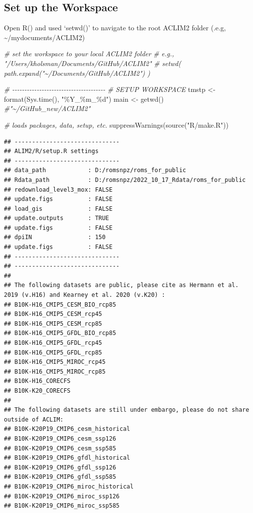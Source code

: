 \documentclass[
]{article}
\newenvironment{Shaded}{\begin{snugshade}}{\end{snugshade}}
\newcommand{\CommentTok}[1]{\textcolor[rgb]{0.56,0.35,0.01}{\textit{#1}}}
\newcommand{\FunctionTok}[1]{\textcolor[rgb]{0.00,0.00,0.00}{#1}}
\newcommand{\NormalTok}[1]{#1}
\newcommand{\OtherTok}[1]{\textcolor[rgb]{0.56,0.35,0.01}{#1}}
\newcommand{\StringTok}[1]{\textcolor[rgb]{0.31,0.60,0.02}{#1}}
\begin{document}
\hypertarget{set-up-the-workspace}{%
\subsection{Set up the Workspace}\label{set-up-the-workspace}}

Open R() and used `setwd()' to navigate to the root ACLIM2 folder (.e.g,
\textasciitilde/mydocuments/ACLIM2)

\begin{Shaded}
\begin{Highlighting}[]
    \CommentTok{\# set the workspace to your local ACLIM2 folder}
    \CommentTok{\# e.g., "/Users/kholsman/Documents/GitHub/ACLIM2"}
    \CommentTok{\# setwd( path.expand("\textasciitilde{}/Documents/GitHub/ACLIM2") )}
   
    \CommentTok{\# {-}{-}{-}{-}{-}{-}{-}{-}{-}{-}{-}{-}{-}{-}{-}{-}{-}{-}{-}{-}{-}{-}{-}{-}{-}{-}{-}{-}{-}{-}{-}{-}{-}{-}{-}{-}{-}{-}}
    \CommentTok{\# SETUP WORKSPACE}
\NormalTok{    tmstp  }\OtherTok{\textless{}{-}} \FunctionTok{format}\NormalTok{(}\FunctionTok{Sys.time}\NormalTok{(), }\StringTok{"\%Y\_\%m\_\%d"}\NormalTok{)}
\NormalTok{    main   }\OtherTok{\textless{}{-}} \FunctionTok{getwd}\NormalTok{()  }\CommentTok{\#"\textasciitilde{}/GitHub\_new/ACLIM2"}
    
    \CommentTok{\# loads packages, data, setup, etc.}
    \FunctionTok{suppressWarnings}\NormalTok{(}\FunctionTok{source}\NormalTok{(}\StringTok{"R/make.R"}\NormalTok{))}
\end{Highlighting}
\end{Shaded}

\begin{verbatim}
## ------------------------------
## ALIM2/R/setup.R settings 
## ------------------------------
## data_path            : D:/romsnpz/roms_for_public 
## Rdata_path           : D:/romsnpz/2022_10_17_Rdata/roms_for_public 
## redownload_level3_mox: FALSE 
## update.figs          : FALSE 
## load_gis             : FALSE 
## update.outputs       : TRUE 
## update.figs          : FALSE 
## dpiIN                : 150 
## update.figs          : FALSE 
## ------------------------------
## ------------------------------
## 
## The following datasets are public, please cite as Hermann et al. 2019 (v.H16) and Kearney et al. 2020 (v.K20) :
## B10K-H16_CMIP5_CESM_BIO_rcp85 
## B10K-H16_CMIP5_CESM_rcp45 
## B10K-H16_CMIP5_CESM_rcp85 
## B10K-H16_CMIP5_GFDL_BIO_rcp85 
## B10K-H16_CMIP5_GFDL_rcp45 
## B10K-H16_CMIP5_GFDL_rcp85 
## B10K-H16_CMIP5_MIROC_rcp45 
## B10K-H16_CMIP5_MIROC_rcp85 
## B10K-H16_CORECFS 
## B10K-K20_CORECFS 
## 
## The following datasets are still under embargo, please do not share outside of ACLIM:
## B10K-K20P19_CMIP6_cesm_historical 
## B10K-K20P19_CMIP6_cesm_ssp126 
## B10K-K20P19_CMIP6_cesm_ssp585 
## B10K-K20P19_CMIP6_gfdl_historical 
## B10K-K20P19_CMIP6_gfdl_ssp126 
## B10K-K20P19_CMIP6_gfdl_ssp585 
## B10K-K20P19_CMIP6_miroc_historical 
## B10K-K20P19_CMIP6_miroc_ssp126 
## B10K-K20P19_CMIP6_miroc_ssp585
\end{verbatim}
\end{document}
